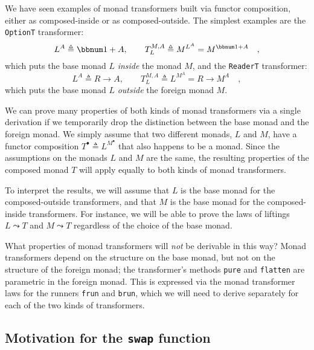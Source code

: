 We have seen examples of monad transformers built via functor composition,
either as composed-inside or as composed-outside. The simplest examples
are the \lstinline!OptionT! transformer:
\[
L^{A}\triangleq\bbnum 1+A,\quad\quad T_{L}^{M,A}\triangleq M^{L^{A}}=M^{\bbnum 1+A}\quad,
\]
which puts the base monad $L$ \emph{inside} the monad $M$, and the
\lstinline!ReaderT! transformer:
\[
L^{A}\triangleq R\rightarrow A,\quad\quad T_{L}^{M,A}\triangleq L^{M^{A}}=R\rightarrow M^{A}\quad,
\]
which puts the base monad $L$ \emph{outside} the foreign monad $M$. 

We can prove many properties of both kinds of monad transformers via
a single derivation if we temporarily drop the distinction between
the base monad and the foreign monad. We simply assume that two different
monads, $L$ and $M$, have a functor composition $T^{\bullet}\triangleq L^{M^{\bullet}}$
that also happens to be a monad. Since the assumptions on the monads
$L$ and $M$ are the same, the resulting properties of the composed
monad $T$ will apply equally to both kinds of monad transformers.

To interpret the results, we will assume that $L$ is the base monad
for the composed-outside transformers, and that $M$ is the base monad
for the composed-inside transformers. For instance, we will be able
to prove the laws of liftings $L\leadsto T$ and $M\leadsto T$ regardless
of the choice of the base monad.

What properties of monad transformers will \emph{not} be derivable
in this way? Monad transformers depend on the structure on the base
monad, but not on the structure of the foreign monad; the transformer\textsf{'}s
methods \lstinline!pure! and \lstinline!flatten! are parametric
in the foreign monad. This is expressed via the monad transformer
laws for the runners \lstinline!frun! and \lstinline!brun!, which
we will need to derive separately for each of the two kinds of transformers.

\subsection{Motivation for the \texttt{swap} function}

